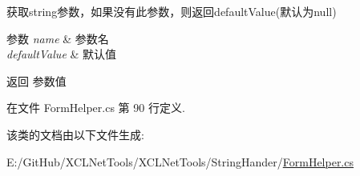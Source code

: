 获取string参数，如果没有此参数，则返回default\+Value(默认为null) 


\begin{DoxyParams}{参数}
{\em name} & 参数名\\
\hline
{\em default\+Value} & 默认值\\
\hline
\end{DoxyParams}
\begin{DoxyReturn}{返回}
参数值
\end{DoxyReturn}


在文件 Form\+Helper.\+cs 第 90 行定义.



该类的文档由以下文件生成\+:\begin{DoxyCompactItemize}
\item 
E\+:/\+Git\+Hub/\+X\+C\+L\+Net\+Tools/\+X\+C\+L\+Net\+Tools/\+String\+Hander/\hyperlink{_form_helper_8cs}{Form\+Helper.\+cs}\end{DoxyCompactItemize}
